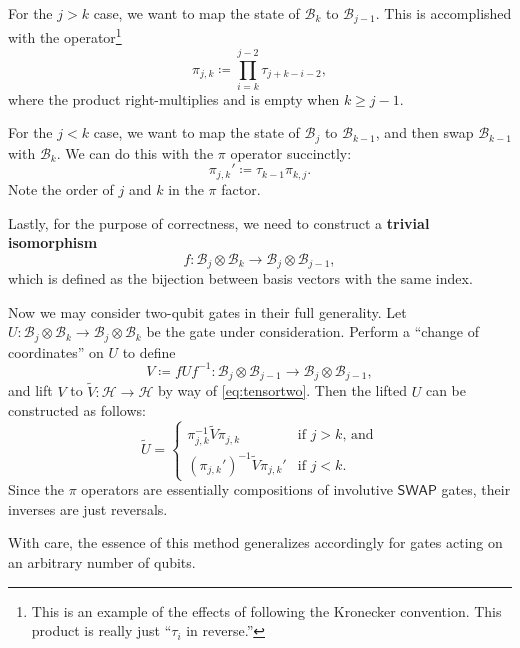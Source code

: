 \documentclass[conference]{IEEEtran}
\newcommand{\defn}[1]{\textbf{#1}}
\newcommand{\SWAP}{\ensuremath{\mathsf{SWAP}}}
\newcommand{\Hil}{\ensuremath{\mathscr{H}}}
\newcommand{\BHil}{\ensuremath{\mathscr{B}}}
\begin{document}
For the $j > k$ case, we want to map the state of $\BHil_k$ to $\BHil_{j-1}$. This is accomplished with the operator\footnote{This is an example of the effects of following the Kronecker convention. This product is really just ``$\tau_i$ in reverse.''}
\begin{equation*} %
\pi_{j,k} \coloneqq \prod_{i=k}^{j-2}\tau_{j+k-i-2},
\end{equation*}
where the product right-multiplies and is empty when $k\ge j-1$.

For the $j < k$ case, we want to map the state of $\BHil_{j}$ to $\BHil_{k-1}$, and then swap $\BHil_{k-1}$ with $\BHil_k$. We can do this with the $\pi$ operator succinctly:
\begin{equation*} %
\pi_{j,k}' \coloneqq \tau_{k-1}\pi_{k,j}.
\end{equation*}
Note the order of $j$ and $k$ in the $\pi$ factor.

Lastly, for the purpose of correctness, we need to construct a \defn{trivial isomorphism}
\begin{equation}\label{eq:triviso}
f : \BHil_j\otimes \BHil_k \to \BHil_j\otimes \BHil_{j-1},
\end{equation}
which is defined as the bijection between basis vectors with the same index.

Now we may consider two-qubit gates in their full generality. Let $U:\BHil_j\otimes \BHil_k\to \BHil_j\otimes \BHil_k$ be the gate under consideration. 
Perform a ``change of coordinates'' on $U$ to define \[V\coloneqq f U f^{-1}:\BHil_j\otimes \BHil_{j-1}\to \BHil_j\otimes \BHil_{j-1},\] and lift $V$ to $\tilde V : \Hil\to \Hil$ by way of \eqref{eq:tensortwo}. Then the lifted $U$ can be constructed as follows:
\begin{equation}
\tilde U = 
\begin{cases}
\pi_{j,k}^{-1}\tilde V\pi_{j,k} & \text{if }j > k\text{, and}\\
(\pi_{j,k}')^{-1}\tilde V\pi_{j,k}' & \text{if }j < k.
\end{cases}
\end{equation}
Since the $\pi$ operators are essentially compositions of involutive \SWAP{} gates, their inverses are just reversals.

With care, the essence of this method generalizes accordingly for gates acting on an arbitrary number of qubits.
\end{document}
